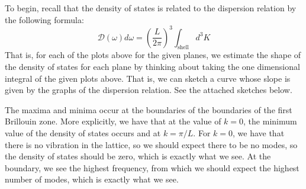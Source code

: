 \documentclass{article}
\begin{document}
To begin, recall that the density of states is related to the dispersion relation by the following formula:
\[\mathcal{D}(\omega)d\omega = \left(\frac{L}{2\pi}\right)^3\int_{\text{shell}}d^3K\]
That is, for each of the plots above for the given planes, we estimate the shape of the density of states for each plane by thinking about taking the one dimensional integral of the given plots above. 
That is, we can sketch a curve whose slope is given by the graphs of the dispersion relation.
See the attached sketches below.


The maxima and minima occur at the boundaries of the boundaries of the first Brillouin zone. 
More explicitly, we have that at the value of $k = 0$, the minimum value of the density of states occurs and at $k = \pi/L$. 
For $k = 0$, we have that there is no vibration in the lattice, so we should expect there to be no modes, so the density of states should be zero, which is exactly what we see. 
At the boundary, we see the highest frequency, from which we should expect the highest number of modes, which is exactly what we see.
\end{document}
